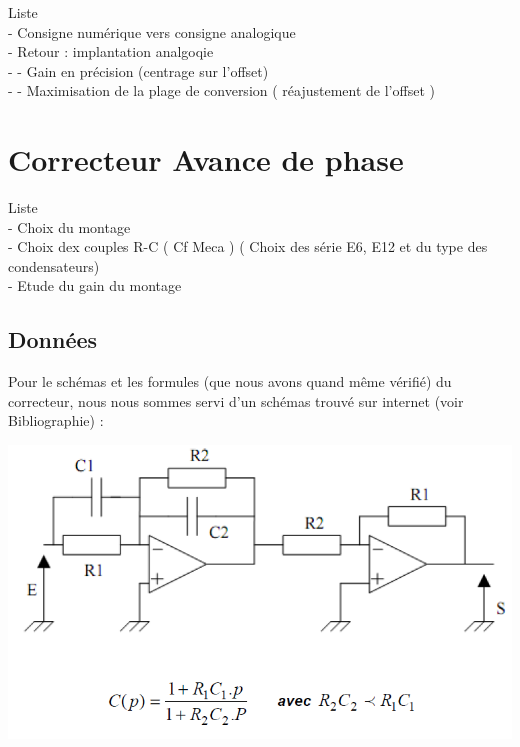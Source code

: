 \documentclass[11pt, french]{article} %
\begin{document}
Liste
\\- Consigne numérique vers consigne analogique
\\- Retour : implantation analgoqie
\\- - Gain en précision (centrage sur l'offset)
\\- - Maximisation de la plage de conversion ( réajustement de l'offset )




\section{Correcteur Avance de phase}

Liste
\\- Choix du montage
\\- Choix dex couples R-C ( Cf Meca ) ( Choix des série E6, E12 et du type des condensateurs)
\\- Etude du gain du montage


\subsection{Données}

\noindent
Pour le schémas et les formules (que nous avons quand même vérifié) du correcteur, nous nous sommes servi d'un schémas trouvé sur internet (voir Bibliographie) :

\begin{center}
\includegraphics[width = 15cm]{SolutionAnalogique/Avph.png} 
\end{center}

\vspace{0.5cm}
\end{document}
